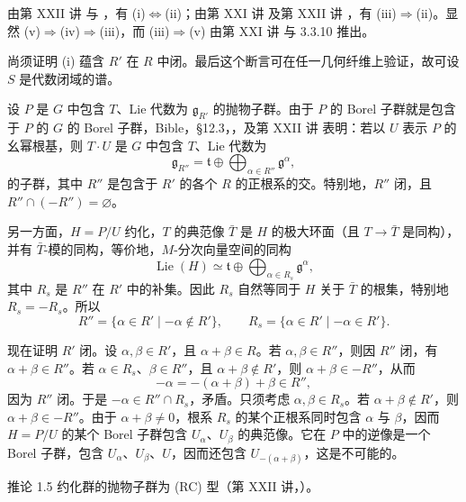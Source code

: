 由第 XXII 讲  与 ，有 (i)\(\Leftrightarrow\)(ii)；由第 XXI 讲  及第 XXII 讲 ，有 (iii)\(\Rightarrow\)(ii)。显然 (v)\(\Rightarrow\)(iv)\(\Rightarrow\)(iii)，而 (iii)\(\Rightarrow\)(v) 由第 XXI 讲  与 3.3.10 推出。

尚须证明 (i) 蕴含 \(R'\) 在 \(R\) 中闭。最后这个断言可在任一几何纤维上验证，故可设 \(S\) 是代数闭域的谱。

设 \(P\) 是 \(G\) 中包含 \(T\)、Lie 代数为 \(\mathfrak g_{R'}\) 的抛物子群。由于 \(P\) 的 Borel 子群就是包含于 \(P\) 的 \(G\) 的 Borel 子群，Bible，\S12.3，，及第 XXII 讲  表明：若以 \(U\) 表示 \(P\) 的幺幂根基，则 \(T\cdot U\) 是 \(G\) 中包含 \(T\)、Lie 代数为
\[
 \mathfrak g_{R''}=\mathfrak t\oplus
 \bigoplus_{\alpha\in R''}\mathfrak g^\alpha,
\]
的子群，其中 \(R''\) 是包含于 \(R'\) 的各个 \(R\) 的正根系的交。特别地，\(R''\) 闭，且 \(R''\cap(-R'')=\varnothing\)。

另一方面，\(H=P/U\) 约化，\(T\) 的典范像 \(\bar T\) 是 \(H\) 的极大环面（且 \(T\to\bar T\) 是同构），并有 \(\bar T\)-模的同构，等价地，\(M\)-分次向量空间的同构
\[
 \operatorname{Lie}(H)\simeq\mathfrak t\oplus
 \bigoplus_{\alpha\in R_s}\mathfrak g^\alpha,
\]
其中 \(R_s\) 是 \(R''\) 在 \(R'\) 中的补集。因此 \(R_s\) 自然等同于 \(H\) 关于 \(\bar T\) 的根集，特别地 \(R_s=-R_s\)。所以
\[
 R''=\{\alpha\in R'\mid-\alpha\notin R'\},
 \qquad
 R_s=\{\alpha\in R'\mid-\alpha\in R'\}.
\]

现在证明 \(R'\) 闭。设 \(\alpha,\beta\in R'\)，且 \(\alpha+\beta\in R\)。若 \(\alpha,\beta\in R''\)，则因 \(R''\) 闭，有 \(\alpha+\beta\in R''\)。若 \(\alpha\in R_s\)、\(\beta\in R''\)，且 \(\alpha+\beta\notin R'\)，则 \(\alpha+\beta\in-R''\)，从而
\[
 -\alpha=-(\alpha+\beta)+\beta\in R'',
\]
因为 \(R''\) 闭。于是 \(-\alpha\in R''\cap R_s\)，矛盾。只须考虑 \(\alpha,\beta\in R_s\)。若 \(\alpha+\beta\notin R'\)，则 \(\alpha+\beta\in-R''\)。由于 \(\alpha+\beta\ne0\)，根系 \(R_s\) 的某个正根系同时包含 \(\alpha\) 与 \(\beta\)，因而 \(H=P/U\) 的某个 Borel 子群包含 \(U_\alpha\)、\(U_\beta\) 的典范像。它在 \(P\) 中的逆像是一个 Borel 子群，包含 \(U_\alpha\)、\(U_\beta\)、\(U\)，因而还包含 \(U_{-(\alpha+\beta)}\)，这是不可能的。

\begin{sgastatement}{推论 1.5}
约化群的抛物子群为 \textup{(RC)} 型（第 XXII 讲，）。
\end{sgastatement}

